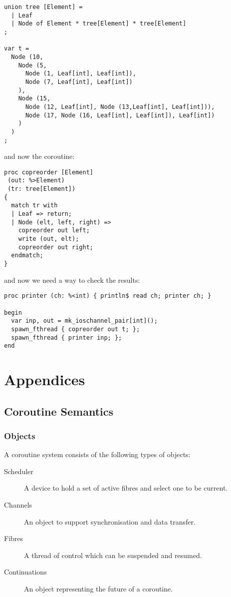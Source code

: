 \documentclass[oneside]{book}
\begin{document}
\begin{verbatim}
union tree [Element] =
  | Leaf
  | Node of Element * tree[Element] * tree[Element]
;

var t = 
  Node (10,
    Node (5,
      Node (1, Leaf[int], Leaf[int]),
      Node (7, Leaf[int], Leaf[int])
    ),
    Node (15,
      Node (12, Leaf[int], Node (13,Leaf[int], Leaf[int])),
      Node (17, Node (16, Leaf[int], Leaf[int]), Leaf[int])
    )
  )
;
\end{verbatim}

and now the coroutine:


\begin{verbatim}
proc copreorder [Element]
 (out: %>Element)
 (tr: tree[Element])
{
  match tr with
  | Leaf => return; 
  | Node (elt, left, right) =>
    copreorder out left;
    write (out, elt);
    copreorder out right;
  endmatch;
}
\end{verbatim}

and now we need a way to check the results:

\begin{verbatim}
proc printer (ch: %<int) { println$ read ch; printer ch; }

begin
  var inp, out = mk_ioschannel_pair[int]();
  spawn_fthread { copreorder out t; };
  spawn_fthread { printer inp; };
end
\end{verbatim}


\part{Appendices}
\chapter{Coroutine Semantics}
\label{Coroutine Semantics}
\section{Objects}
A coroutine system consists of the following types of objects:
\begin{description}
\item[Scheduler] A device to hold a set of active fibres and
select one to be current.
\item[Channels] An object to support synchronisation and data transfer.
\item[Fibres] A thread of control which can be suspended and resumed.
\item[Continuations] An object representing the future of a coroutine.
\end{description}
\end{document}
